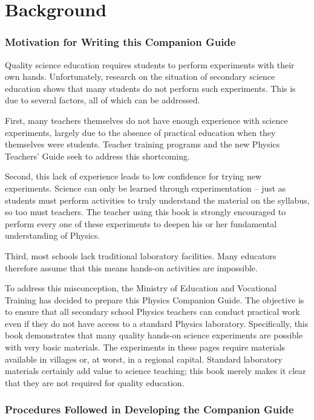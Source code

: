 \chapter*{Background}

\subsection*{Motivation for Writing this Companion Guide}

Quality science education requires students to perform experiments with their own hands. Unfortunately, research on the situation of secondary science education shows that many students do not perform such experiments. This is due to several factors, all of which can be addressed.

First, many teachers themselves do not have enough experience with science experiments, largely due to the absence of practical education when they themselves were students. Teacher training programs and the new Physics Teachers' Guide seek to address this shortcoming.

Second, this lack of experience leads to low confidence for trying new experiments. Science can only be learned through experimentation -- just as students must perform activities to truly understand the material on the syllabus, so too must teachers. The teacher using this book is strongly encouraged to perform every one of these experiments to deepen his or her fundamental understanding of Physics.

Third, most schools lack traditional laboratory facilities. Many educators therefore assume that this means hands-on activities are impossible.

To address this misconception, the Ministry of Education and Vocational Training has decided to prepare this Physics Companion Guide. The objective is to ensure that all secondary school Physics teachers can conduct practical work even if they do not have access to a standard Physics laboratory. Specifically, this book demonstrates that many quality hands-on science experiments are possible with very basic materials. The experiments in these pages require materials available in villages or, at worst, in a regional capital. Standard laboratory materials certainly add value to science teaching; this book merely makes it clear that they are not required for quality education.

\subsection*{Procedures Followed in Developing the Companion Guide}

